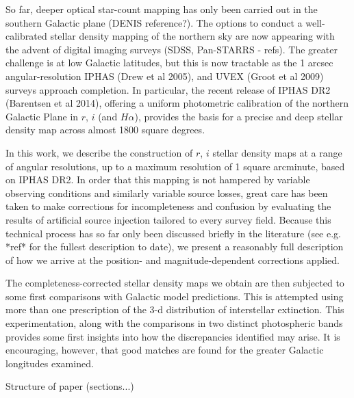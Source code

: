 \documentclass[a4paper,useAMS,usenatbib]{mn2e}
\begin{document}
So far, deeper optical star-count mapping has only been carried out in the 
southern Galactic plane (DENIS reference?).  The options to conduct a 
well-calibrated stellar density mapping of the northern sky are now 
appearing with the advent of digital imaging surveys (SDSS, Pan-STARRS - 
refs).  The greater challenge is at low Galactic latitudes, but this is now 
tractable as the 1 arcsec angular-resolution IPHAS (Drew et al 2005), and 
UVEX (Groot et al 2009) surveys approach completion.  In particular, the 
recent release of IPHAS DR2 (Barentsen et al 2014), offering a uniform 
photometric calibration of the northern Galactic Plane in $r$, $i$ (and 
$H\alpha$), provides the basis for a precise and deep stellar density map 
across almost 1800 square degrees.

In this work, we describe the construction of $r$, $i$ stellar density maps at
a range of angular resolutions, up to a maximum resolution of 1 square arcminute, 
based on IPHAS DR2.  In order that this mapping is not hampered by variable 
observing conditions and similarly variable source losses, great care has been 
taken to make corrections for incompleteness and confusion by evaluating the 
results of artificial source injection tailored to every survey field. Because 
this technical process has so far only been discussed briefly in the 
literature (see e.g. *ref* for the fullest description to date), we present a 
reasonably full description of how we arrive at the position- and 
magnitude-dependent corrections applied. 

The completeness-corrected stellar density maps we obtain are then subjected 
to some first comparisons with Galactic model predictions.  This is attempted 
using more than one prescription of the 3-d distribution of interstellar 
extinction.  This experimentation, along with the comparisons in two distinct 
photospheric bands provides some first insights into how the discrepancies 
identified may arise. It is encouraging, however, that good matches are found 
for the greater Galactic longitudes examined.

Structure of paper (sections...)
\end{document}
